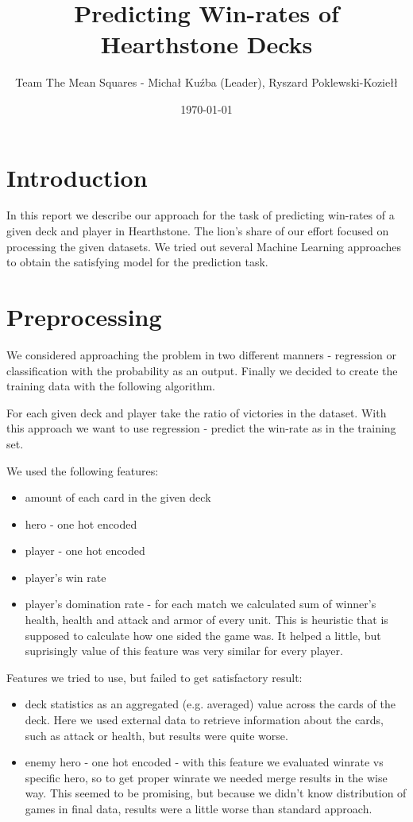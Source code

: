 \documentclass[a4paper]{article}
\title{Predicting Win-rates of Hearthstone Decks}
\author{Team The Mean Squares - Michał Kuźba (Leader), Ryszard Poklewski-Koziełł}
\date{\today}
\begin{document}
\maketitle

\section{Introduction}
\label{sec:introduction}
In this report we describe our approach for the task of predicting win-rates of a given deck and player in Hearthstone. 
The lion's share of our effort focused on processing the given datasets.
We tried out several Machine Learning approaches to obtain the satisfying model for the prediction task.

\section{Preprocessing}
We considered approaching the problem in two different manners - regression or classification with the probability as an output. 
Finally we decided to create the training data with the following algorithm.

For each given deck and player take the ratio of victories in the dataset.
With this approach we want to use regression - predict the win-rate as in the training set.

We used the following features:
\begin{itemize}
\item amount of each card in the given deck
\item hero - one hot encoded
\item player - one hot encoded
\item player's win rate
\item player's domination rate - for each match we calculated sum of winner's health, health and attack and armor of every unit. This is heuristic that is supposed to calculate how one sided the game was. It helped a little, but suprisingly value of this feature was very similar for every player.
\end{itemize}

Features we tried to use, but failed to get satisfactory result:
\begin{itemize}
\item deck statistics as an aggregated (e.g. averaged) value across the cards of the deck. Here we used external data to retrieve information about the cards, such as attack or health, but results were quite worse.
\item enemy hero - one hot encoded - with this feature we evaluated winrate vs specific hero, so to get proper winrate we needed merge results in the wise way. This seemed to be promising, but because we didn't know distribution of games in final data, results were a little worse than standard approach.

\end{itemize}
\end{document}
